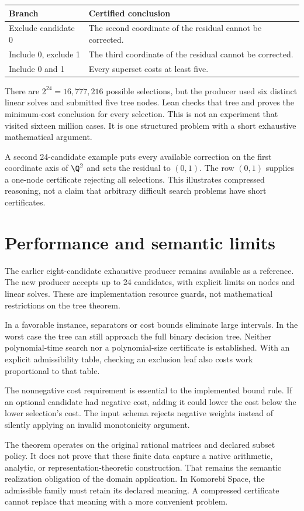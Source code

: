 \begin{center}
\begin{tabularx}{\linewidth}{@{}lX@{}}
\toprule Branch & Certified conclusion\\\midrule
Exclude candidate 0 & The second coordinate of the residual cannot be corrected.\\
Include 0, exclude 1 & The third coordinate of the residual cannot be corrected.\\
Include 0 and 1 & Every superset costs at least five.\\
\bottomrule
\end{tabularx}
\end{center}

There are $2^{24}=16{,}777{,}216$ possible selections, but the producer used six distinct linear solves and submitted five tree nodes. Lean checks that tree and proves the minimum-cost conclusion for every selection. This is not an experiment that visited sixteen million cases. It is one structured problem with a short exhaustive mathematical argument.

A second 24-candidate example puts every available correction on the first coordinate axis of $\Q^2$ and sets the residual to $(0,1)$. The row $(0,1)$ supplies a one-node certificate rejecting all selections. This illustrates compressed reasoning, not a claim that arbitrary difficult search problems have short certificates.

\section{Performance and semantic limits}

The earlier eight-candidate exhaustive producer remains available as a reference. The new producer accepts up to 24 candidates, with explicit limits on nodes and linear solves. These are implementation resource guards, not mathematical restrictions on the tree theorem.

In a favorable instance, separators or cost bounds eliminate large intervals. In the worst case the tree can still approach the full binary decision tree. Neither polynomial-time search nor a polynomial-size certificate is established. With an explicit admissibility table, checking an exclusion leaf also costs work proportional to that table.

The nonnegative cost requirement is essential to the implemented bound rule. If an optional candidate had negative cost, adding it could lower the cost below the lower selection's cost. The input schema rejects negative weights instead of silently applying an invalid monotonicity argument.

The theorem operates on the original rational matrices and declared subset policy. It does not prove that these finite data capture a native arithmetic, analytic, or representation-theoretic construction. That remains the semantic realization obligation of the domain application. In Komorebi Space, the admissible family must retain its declared meaning. A compressed certificate cannot replace that meaning with a more convenient problem.
